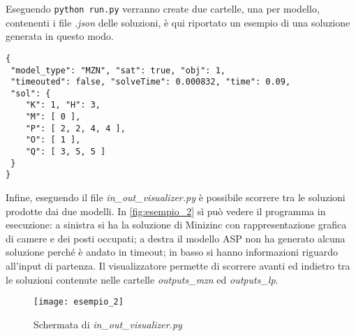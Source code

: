 Eseguendo \lstinline{python run.py} verranno create due cartelle, una per modello, contenenti i file \emph{.json} delle soluzioni, è qui riportato un esempio di una soluzione generata in questo modo.
\begin{lstlisting}
{
 "model_type": "MZN", "sat": true, "obj": 1,      
 "timeouted": false, "solveTime": 0.000832, "time": 0.09,
 "sol": {
    "K": 1, "H": 3,
    "M": [ 0 ],
    "P": [ 2, 2, 4, 4 ],
    "O": [ 1 ],
    "Q": [ 3, 5, 5 ]
 }
}
\end{lstlisting}
Infine, eseguendo il file \emph{in\_out\_visualizer.py} è possibile scorrere tra le soluzioni prodotte dai due modelli.
In \autoref{fig:esempio_2} sì può vedere il programma in esecuzione:
a sinistra si ha la soluzione di Minizinc con rappresentazione grafica di camere e dei posti occupati;
a destra il modello ASP non ha generato alcuna soluzione perché è andato in timeout;
in basso si hanno informazioni riguardo all'input di partenza.
Il visualizzatore permette di scorrere avanti ed indietro tra le soluzioni contenute nelle cartelle \emph{outputs\_mzn} ed \emph{outputs\_lp}.
\begin{figure}[ht]
  \centering
  \texttt{[image: esempio\_2]}
  \caption{Schermata di \emph{in\_out\_visualizer.py}}
  \label{fig:esempio_2}
\end{figure}

